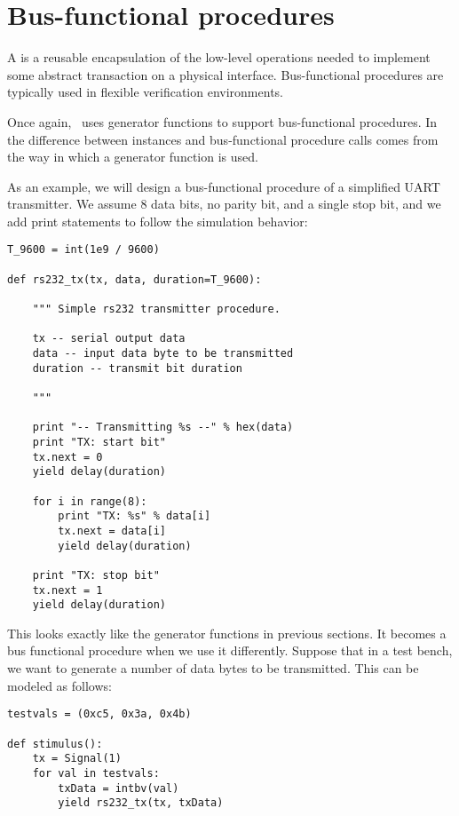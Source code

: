 \section{Bus-functional procedures \label{intro-bfm}}

A  is a reusable encapsulation of the
low-level operations needed to implement some abstract transaction on
a physical interface. Bus-functional procedures are typically used in
flexible verification environments.

Once again, \myhdl\ uses generator functions to support
bus-functional procedures. In \myhdl\, the difference between
instances and bus-functional procedure calls comes from the way in
which a generator function is used.

As an example, we will design a bus-functional procedure of a
simplified UART transmitter. We assume 8 data bits, no parity bit, and
a single stop bit, and we add print statements to follow the
simulation behavior:

\begin{verbatim}
T_9600 = int(1e9 / 9600)

def rs232_tx(tx, data, duration=T_9600):
    
    """ Simple rs232 transmitter procedure.

    tx -- serial output data
    data -- input data byte to be transmitted
    duration -- transmit bit duration
    
    """

    print "-- Transmitting %s --" % hex(data)
    print "TX: start bit"      
    tx.next = 0
    yield delay(duration)

    for i in range(8):
        print "TX: %s" % data[i]
        tx.next = data[i]
        yield delay(duration)

    print "TX: stop bit"      
    tx.next = 1
    yield delay(duration)
\end{verbatim}

This looks exactly like the generator functions in previous sections. It
becomes a bus functional procedure when we use it differently. Suppose
that in a test bench, we want to generate a number of data bytes to be
transmitted. This can be modeled as follows:


\begin{verbatim}
testvals = (0xc5, 0x3a, 0x4b)

def stimulus():
    tx = Signal(1)
    for val in testvals:
        txData = intbv(val)
        yield rs232_tx(tx, txData)
\end{verbatim}

